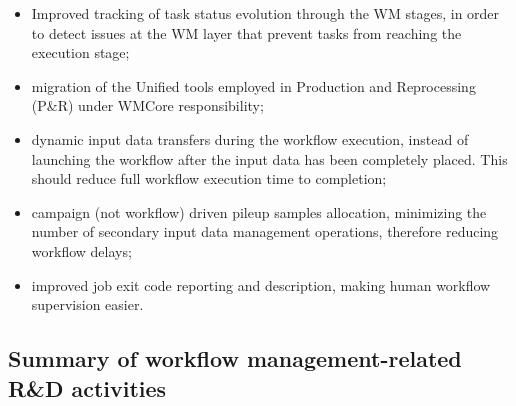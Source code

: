 \begin{itemize}
\item Improved tracking of task status evolution through the \gls{WM} stages, in order to detect issues at the \gls{WM} layer that prevent tasks from reaching the execution stage;

\item migration of the Unified tools employed in Production and Reprocessing (P\&R) under WMCore responsibility;

\item dynamic input data transfers during the workflow execution, instead of launching the workflow after the input data has been completely placed. This should reduce full workflow execution time to completion;

\item campaign (not workflow) driven pileup samples allocation, minimizing the number of secondary input data management operations, therefore reducing workflow delays;

\item improved job exit code reporting and description, making human workflow supervision easier.
\end{itemize}



\subsection{Summary of workflow management-related R\&D activities} 

